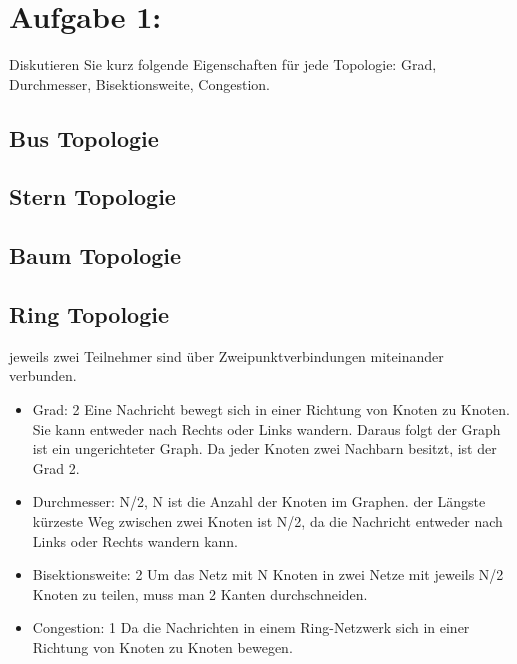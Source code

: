 \section{Aufgabe 1:}
Diskutieren Sie kurz folgende Eigenschaften für jede Topologie: Grad, Durchmesser, Bisektionsweite, Congestion.
\subsection{Bus Topologie}
\subsection{Stern Topologie}
\subsection{Baum Topologie}
\subsection{Ring Topologie}
 jeweils zwei Teilnehmer sind über Zweipunktverbindungen miteinander verbunden.
\begin{itemize}
  \item Grad: 2
  \newline Eine Nachricht bewegt sich in einer Richtung von Knoten zu Knoten. Sie kann entweder nach Rechts oder Links wandern. Daraus folgt der Graph ist ein ungerichteter Graph. Da jeder Knoten zwei Nachbarn besitzt, ist der Grad 2.
  \item Durchmesser: N/2, N ist die Anzahl der Knoten im Graphen.
   \newline der Längste kürzeste Weg zwischen zwei Knoten ist N/2, da die Nachricht entweder nach Links oder Rechts wandern kann.
  \item Bisektionsweite: 2
  \newline  Um das Netz mit N Knoten in zwei Netze mit jeweils N/2 Knoten zu teilen, muss man 2 Kanten durchschneiden.
  \item Congestion: 1
  \newline Da die  Nachrichten in einem Ring-Netzwerk  sich in einer Richtung von Knoten zu Knoten bewegen.   
\end{itemize}

